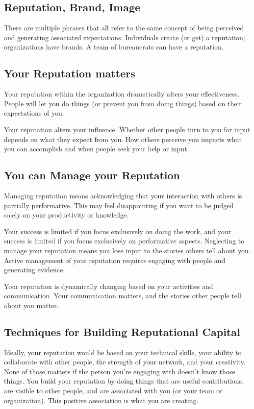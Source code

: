 \subsection*{Reputation, Brand, Image}

There are multiple phrases that all refer to the same concept of being perceived and generating associated expectations. Individuals create (or get) a reputation; organizations have brands. A team of bureaucrats can have a reputation. 

\subsection*{Your Reputation matters}

Your reputation within the organization dramatically alters your effectiveness. People will let you do things (or prevent you from doing things) based on their expectations of you. 

Your reputation alters your influence. Whether other people turn to you for input depends on what they expect from you. How others perceive you impacts what you can accomplish and when people seek your help or input.

\subsection*{You can Manage your Reputation}

Managing reputation means acknowledging that your interaction with others is partially performative. This may feel disappointing if you want to be judged solely on your productivity or knowledge. 

Your success is limited if you focus exclusively on doing the work, and your success is limited if you focus exclusively on performative aspects. 
Neglecting to manage your reputation means you lose input to the stories others tell about you. Active management of your reputation requires engaging with people and generating evidence. 

Your reputation is dynamically changing based on your activities and communication. Your communication matters, and the stories other people tell about you matter.

\subsection*{Techniques for Building Reputational Capital}

Ideally, your reputation would be based on your technical skills, your ability to collaborate with other people, the strength of your network, and your creativity. None of those matters if the person you're engaging with doesn't know those things. 
You build your reputation by doing things that are useful contributions, are visible to other people, and are associated with you (or your team or organization). This positive association is what you are creating.

